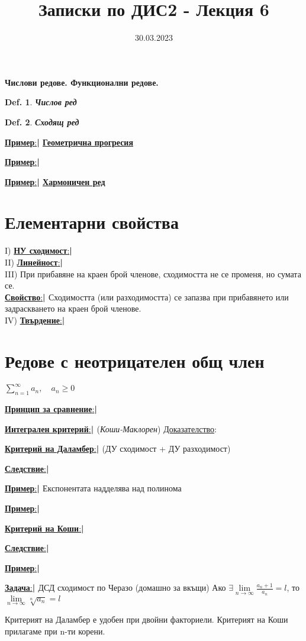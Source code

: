 \documentclass[12pt]{article}
\newcommand{\halfbox}[1]{\underline{\textbf{#1}:}\textbf{\large{| }}}
\newtheorem{definition}{Def.}
\begin{document}
	\color{white}
	\pagecolor{darkgray}
	\title{Записки по ДИС2 - Лекция 6}
	\date{30.03.2023}
	\maketitle
	\begin{center}
		\Large
		\textbf{Числови редове. Функционални редове.}
	\end{center}
	
	\begin{definition}
		\textbf{Числов ред}
	\end{definition}

	\begin{definition}
		\textbf{Сходящ ред}
	\end{definition}
	
	\halfbox{Пример} \textbf{\underline{Геометрична прогресия}}
	
	\halfbox{Пример}
	
	\halfbox{Пример} \textbf{\underline{Хармоничен ред}}
	
	
	\section*{Елементарни свойства}
	I) \halfbox{НУ сходимост}
	\\
	II) \halfbox{Линейност}
	\\
	III) При прибавяне на краен брой членове, сходимостта не се променя, но сумата се.\\
	\halfbox{Свойство} Сходимостта (или разходимостта) се запазва при прибавянето или задраскването на краен брой членове.
	\\
	IV) \halfbox{Твърдение} 
	
	\section*{Редове с неотрицателен общ член}
	$\sum_{n=1}^{\infty}a_n,\quad a_n\geq 0$
	
	\halfbox{Принцип за сравнение}
	
	\halfbox{Интегрален критерий} (\textit{Коши-Маклорен})
	\underline{Доказателство}:
	
	\halfbox{Критерий на Даламбер} (ДУ сходимост + ДУ разходимост)
	
	\halfbox{Следствие}
	
	\halfbox{Пример} Експонентата надделява над полинома
	
	\halfbox{Пример}
	
	\halfbox{Критерий на Коши}
	
	\halfbox{Следствие}
	
	\halfbox{Пример}
	
	\halfbox{Задача} ДСД сходимост по Черазо (домашно за вкъщи)
	 Ако $\exists\lim\limits_{n\to\infty}\frac{a_n+1}{a_n}=l$, то $\lim\limits_{n\to\infty}\sqrt[n]{a_n}=l$
	
	Критерият на Даламбер е удобен при двойни факториели. Критерият на Коши прилагаме при n-ти корени.
	
	
\end{document}
